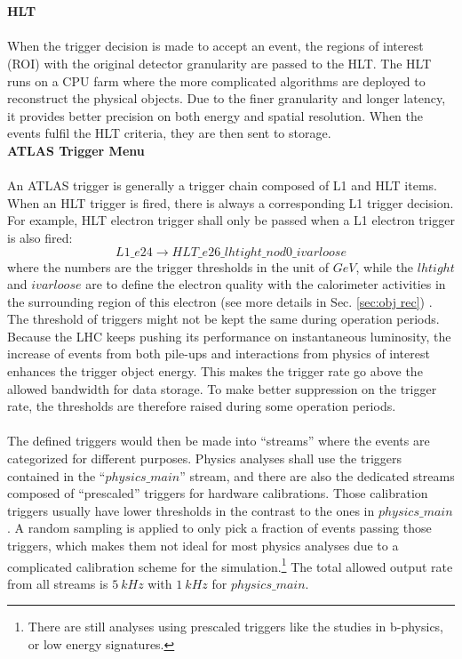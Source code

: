 \\
\\{\bf HLT}
\\
\\When the trigger decision is made to accept an event, the regions of interest (ROI) with the original detector granularity are passed to the HLT. The HLT runs on a CPU farm where the more complicated algorithms are deployed to reconstruct the physical objects. Due to the finer granularity and longer latency, it provides better precision on both energy and spatial resolution. When the events fulfil the HLT criteria, they are then sent to storage. 
\newpage
\noindent
\\{\bf ATLAS Trigger Menu}
\\
\\An ATLAS trigger is generally a trigger chain composed of L1 and HLT items. When an HLT trigger is fired, there is always a corresponding L1 trigger decision. For example, HLT electron trigger shall only be passed when a L1 electron trigger is also fired:
\begin{equation}
L1\_e24 \rightarrow HLT\_e26\_lhtight\_nod0\_ivarloose
\end{equation}
where the numbers are the trigger thresholds in the unit of $GeV$, while the $lhtight$ and $ivarloose$ are to define the electron quality with the calorimeter activities in the surrounding region of this electron (see more details in Sec. \ref{sec:obj rec}) . The threshold of triggers might not be kept the same during operation periods. Because the LHC keeps pushing its performance on instantaneous luminosity, the increase of events from both pile-ups and interactions from physics of interest enhances the trigger object energy. This makes the trigger rate go above the allowed bandwidth for data storage. To make better suppression on the trigger rate, the thresholds are therefore raised during some operation periods. 
\\
\\The defined triggers would then be made into ``streams'' where the events are categorized for different purposes. Physics analyses shall use the triggers contained in the ``$physics\_main$'' stream, and there are also the dedicated streams composed of ``prescaled'' triggers for hardware calibrations. Those calibration triggers usually have lower thresholds in the contrast to the ones in $physics\_main$. A random sampling is applied to only pick a fraction of events passing those triggers, which makes them not ideal for most physics analyses due to a complicated calibration scheme for the simulation.\footnote{There are still analyses using prescaled triggers like the studies in b-physics, or low energy signatures.} The total allowed output rate from all streams is $5~kHz$ with $1~kHz$ for $physics\_main$. 

